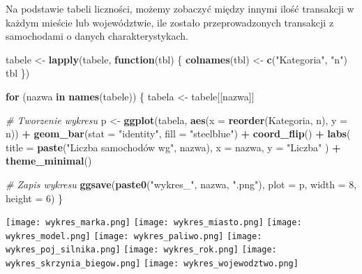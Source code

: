 \documentclass[
]{article}
\newenvironment{Shaded}{\begin{snugshade}}{\end{snugshade}}
\newcommand{\AttributeTok}[1]{\textcolor[rgb]{0.13,0.29,0.53}{#1}}
\newcommand{\CommentTok}[1]{\textcolor[rgb]{0.56,0.35,0.01}{\textit{#1}}}
\newcommand{\ControlFlowTok}[1]{\textcolor[rgb]{0.13,0.29,0.53}{\textbf{#1}}}
\newcommand{\DecValTok}[1]{\textcolor[rgb]{0.00,0.00,0.81}{#1}}
\newcommand{\FunctionTok}[1]{\textcolor[rgb]{0.13,0.29,0.53}{\textbf{#1}}}
\newcommand{\NormalTok}[1]{#1}
\newcommand{\OtherTok}[1]{\textcolor[rgb]{0.56,0.35,0.01}{#1}}
\newcommand{\SpecialCharTok}[1]{\textcolor[rgb]{0.81,0.36,0.00}{\textbf{#1}}}
\newcommand{\StringTok}[1]{\textcolor[rgb]{0.31,0.60,0.02}{#1}}
\begin{document}
Na podstawie tabeli liczności, możemy zobaczyć między innymi ilość
transakcji w każdym mieście lub województwie, ile zostało
przeprowadzonych transakcji z samochodami o danych charakterystykach.

\begin{Shaded}
\begin{Highlighting}[]
\NormalTok{tabele }\OtherTok{\textless{}{-}} \FunctionTok{lapply}\NormalTok{(tabele, }\ControlFlowTok{function}\NormalTok{(tbl) \{}
  \FunctionTok{colnames}\NormalTok{(tbl) }\OtherTok{\textless{}{-}} \FunctionTok{c}\NormalTok{(}\StringTok{"Kategoria"}\NormalTok{, }\StringTok{"n"}\NormalTok{)}
\NormalTok{  tbl}
\NormalTok{\})}

\ControlFlowTok{for}\NormalTok{ (nazwa }\ControlFlowTok{in} \FunctionTok{names}\NormalTok{(tabele)) \{}
\NormalTok{  tabela }\OtherTok{\textless{}{-}}\NormalTok{ tabele[[nazwa]]}
  
  \CommentTok{\# Tworzenie wykresu}
\NormalTok{  p }\OtherTok{\textless{}{-}} \FunctionTok{ggplot}\NormalTok{(tabela, }\FunctionTok{aes}\NormalTok{(}\AttributeTok{x =} \FunctionTok{reorder}\NormalTok{(Kategoria, n), }\AttributeTok{y =}\NormalTok{ n)) }\SpecialCharTok{+}
    \FunctionTok{geom\_bar}\NormalTok{(}\AttributeTok{stat =} \StringTok{"identity"}\NormalTok{, }\AttributeTok{fill =} \StringTok{"steelblue"}\NormalTok{) }\SpecialCharTok{+}
    \FunctionTok{coord\_flip}\NormalTok{() }\SpecialCharTok{+}
    \FunctionTok{labs}\NormalTok{(}
      \AttributeTok{title =} \FunctionTok{paste}\NormalTok{(}\StringTok{"Liczba samochodów wg"}\NormalTok{, nazwa),}
      \AttributeTok{x =}\NormalTok{ nazwa,}
      \AttributeTok{y =} \StringTok{"Liczba"}
\NormalTok{    ) }\SpecialCharTok{+}
    \FunctionTok{theme\_minimal}\NormalTok{()}
  
  \CommentTok{\# Zapis wykresu}
  \FunctionTok{ggsave}\NormalTok{(}\FunctionTok{paste0}\NormalTok{(}\StringTok{"wykres\_"}\NormalTok{, nazwa, }\StringTok{".png"}\NormalTok{), }\AttributeTok{plot =}\NormalTok{ p, }\AttributeTok{width =} \DecValTok{8}\NormalTok{, }\AttributeTok{height =} \DecValTok{6}\NormalTok{)}
\NormalTok{\}}
\end{Highlighting}
\end{Shaded}

\texttt{[image: wykres\_marka.png]} \texttt{[image: wykres\_miasto.png]}
\texttt{[image: wykres\_model.png]} \texttt{[image: wykres\_paliwo.png]}
\texttt{[image: wykres\_poj\_silnika.png]}
\texttt{[image: wykres\_rok.png]}
\texttt{[image: wykres\_skrzynia\_biegow.png]}
\texttt{[image: wykres\_wojewodztwo.png]}
\end{document}
